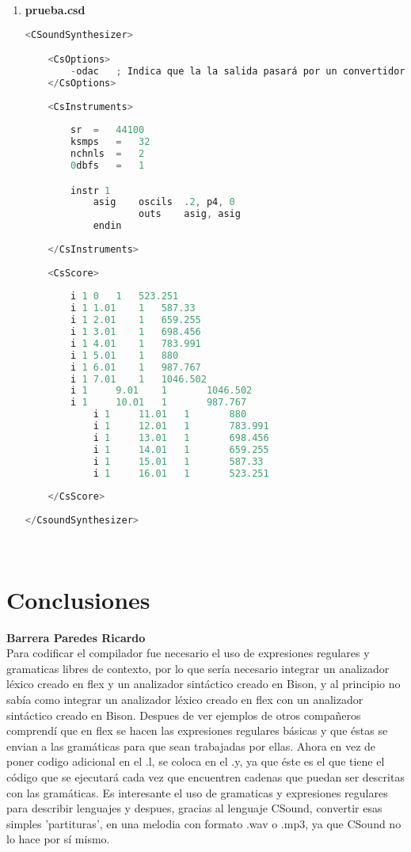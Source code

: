 \documentclass[12pt]{article}
\begin{document}
\begin{enumerate}
\begin{lstlisting}[language=C]
	return 0;
\end{lstlisting}\\

\item {\bf prueba.csd}\\
\begin{lstlisting}[language=C]
<CSoundSynthesizer>

	<CsOptions>
		-odac	; Indica que la la salida pasará por un convertidor Digital-Analógoco (DAC) y será reproducida
	</CsOptions>
	
	<CsInstruments>
	
		sr	=	44100
		ksmps	=	32
		nchnls	=	2
		0dbfs	=	1

		instr 1
			asig    oscils	.2, p4, 0
        			outs    asig, asig
	        endin
	
	</CsInstruments>
	
	<CsScore>
	
		i 1	0	1	523.251
		i 1	1.01	1	587.33
		i 1	2.01	1	659.255
		i 1	3.01	1	698.456
		i 1	4.01	1	783.991
		i 1	5.01	1	880
		i 1	6.01	1	987.767
		i 1	7.01	1	1046.502
		i 1     9.01    1       1046.502
		i 1     10.01   1       987.767
        	i 1     11.01   1       880
	        i 1     12.01   1       783.991
        	i 1     13.01   1       698.456
	        i 1     14.01   1       659.255
        	i 1     15.01   1       587.33
	        i 1     16.01   1       523.251
	
	</CsScore>
	
</CsoundSynthesizer>
\end{lstlisting}\\

\end{enumerate}


\section{Conclusiones}

{\bf Barrera Paredes Ricardo}\\
Para codificar el compilador fue necesario el uso de expresiones regulares y gramaticas libres de contexto, por lo que sería necesario integrar un analizador léxico creado en flex y un analizador sintáctico creado en Bison, y al principio no sabía como integrar un analizador léxico creado en flex con un analizador sintáctico creado en Bison. Despues de ver ejemplos de otros compañeros comprendí que en flex se hacen las expresiones regulares básicas y que éstas se envian a las gramáticas para que sean trabajadas por ellas. Ahora en vez de poner codigo adicional en el .l, se coloca en el .y, ya que éste es el que tiene el código que se ejecutará cada vez que encuentren cadenas que puedan ser descritas con las gramáticas. Es interesante el uso de gramaticas y expresiones regulares para describir lenguajes y despues, gracias al lenguaje CSound, convertir esas simples 'partituras', en una melodia con formato .wav o .mp3, ya que CSound no lo hace por sí mismo.
\end{document}
